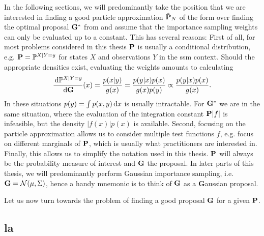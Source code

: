 In the following sections, we will predominantly take the position that we are interested in finding a good particle approximation $\hat\P_{N}$ of the form  over finding the optimal proposal $\G^{\ast}$ from  and assume that the importance sampling weights can only be evaluated up to a constant. 
This has several reasons: First of all, for most problems considered in this thesis $\P$ is usually a conditional distribution, e.g. $\P = \mathbb P^{X|Y=y}$ for states $X$ and observations $Y$ in the \acrshort{ssm} context. Should the appropriate densities exist, evaluating the weights amounts to calculating 
$$
\rnd{\mathbb P^{X| Y= y}}{\G}(x) = \frac{p(x|y)}{g(x)} = \frac{p(y|x)p(x)}{g(x)p(y)} \propto \frac{p(y|x)p(x)}{g(x)}.
$$
In these situations $p(y) = \int p(x,y)\d x$ is usually intractable. For $\G^{\ast}$ we are in the same situation, where the evaluation of the integration constant $\P \lvert f \rvert$ is infeasible, but the density $\lvert f(x)\rvert p(x)$ is available.
Second, focusing on the particle approximation allows us to consider multiple test functions $f$, e.g. focus on different marginals of $\P$, which is usually what practitioners are interested in. 
Finally, this allows us to simplify the notation used in this thesis. $\P$ will always be the probability measure of interest and $\G$ the proposal. In later parts of this thesis, we will predominantly perform Gaussian importance sampling, i.e. $\G = \mathcal N(\mu, \Sigma)$, hence a handy mnemonic is to think of $\G$ as a \textbf{G}aussian proposal.

Let us now turn towards the problem of finding a good proposal $\G$ for a given $\P$. 

\subsection{\texorpdfstring{\Acrfull{la}}{Laplace approximation}}
\label{subsec:la}

